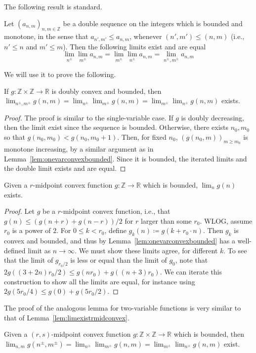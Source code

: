  The following result is standard.
 
 \begin{lemma}
  Let $(a_{n,m})_{n,m \in \mathbb{Z}}$ be a double sequence on the integers which is bounded and monotone, in the sense that $a_{n',m'} \leq a_{n,m}$, whenever $(n',m') \leq (n,m)$ (i.e., $n' \leq n$ and $m' \leq m$). Then the following limits exist and are equal
  \[
  \lim_{n^{\pm}}\lim_{m^{\pm}} a_{n,m} = \lim_{m^{\pm}}\lim_{n^{\pm}} a_{n,m} = \lim_{n^{\pm}, m^{\pm}} a_{n,m}  
  \]
 \end{lemma}
 
 We will use it to prove the following.
 
 \begin{lemma}
   If $g \colon \mathbb{Z} \times \mathbb{Z} \to \mathbb{R}$ is doubly convex and bounded, then $\lim_{n^{\pm},m^{\pm}} g(n,m) = \lim_{n^{\pm}} \lim_{m^{\pm}} g(n,m) = \lim_{m^{\pm}} \lim_{n^{\pm}} g(n,m)$ exists.
 \end{lemma}
 \begin{proof}
 The proof is similar to the single-variable case.
 If $g$ is doubly decreasing, then the limit exist since the sequence is bounded.
 Otherwise, there exists $n_0,m_0$ so that $g(n_0,m_0) < g(n_0,m_0+1)$. Then, for fixed $n_0$, $(g(n_0,m))_{m \geq m_0}$ is monotone increasing, by a similar argument as in Lemma~\ref{lem:onevarconvexbounded}. Since it is bounded, the iterated limits and the double limit exists and are equal.
 \end{proof}
 
 \begin{lemma}
 Given a $r$-midpoint convex function $g \colon \mathbb{Z} \to \mathbb{R}$ which is bounded, $\lim_n g(n)$ exists.
 \label{lem:limexistrmidconvex}
 \end{lemma}
 \begin{proof}
 Let $g$ be a $r$-midpoint convex function, i.e., that $g(n) \le (g(n+r) + g(n-r))/2$ for $r$ larger than some
$r_0$. WLOG, assume $r_0$ is a power of $2$. For $0 \le k
< r_0$, define $g_k(n) \coloneqq g(k + r_0 \cdot n)$. Then $g_k$ is convex and bounded, and thus by Lemma~\ref{lem:onevarconvexbounded} has
a well-defined limit as $n \to \infty$. We must show these limits
agree, for different $k$. To see that the limit of $g_{r_0/2}$ is less or equal than the limit of $g_0$,
note that $2g((3+2n)r_0/2) \le g(nr_0) + g((n+3)r_0)$. We can iterate
this construction to show all the limits are equal, for instance using
$2g(5r_0/4) \le g(0) + g(5r_0/2)$.
 \end{proof}
 
 The proof of the analogous lemma for two-variable functions is very similar to that of Lemma~\ref{lem:limexistrmidconvex}.
 
  \begin{lemma}
 Given a $(r,s)$-midpoint convex function $g \colon \mathbb{Z} \times \mathbb{Z} \to \mathbb{R}$ which is bounded, then $\lim_{n,m} g(n^{\pm},m^{\pm}) = \lim_{n^{\pm}} \lim_{m^{\pm}} g(n,m) = \lim_{m^{\pm}} \lim_{n^{\pm}} g(n,m)$ exist.
 \label{lem:limexistrmidconvextwovar}
 \end{lemma}